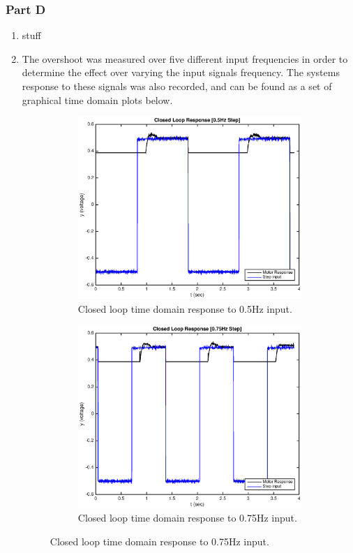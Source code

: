 \documentclass[11pt,a4paper]{article}
\begin{document}
\subsubsection{Part D}
\label{sec:d}
\begin{enumerate}
	\item stuff
	
	
	
	
	
	\item The overshoot was measured over five different input frequencies in order to determine the effect over varying the input signals frequency. The systems response to these signals was also recorded, and can be found as a set of graphical time domain plots below.
	\begin{figure}[H]
	  \begin{subfigure}{0.5\textwidth}
	  \includegraphics[width=0.9\linewidth]{Matlab_Code/Figures/D2_0_5Hz.eps} 
	  \caption{Closed loop time domain response to 0.5Hz input.}
	  \label{fig:subim1}
	  \end{subfigure}
	  \begin{subfigure}{0.5\textwidth}
	  \includegraphics[width=0.9\linewidth]{Matlab_Code/Figures/D2_0_75Hz.eps}
	  \caption{Closed loop time domain response to 0.75Hz input.}
	  \label{fig:subim2}
	  \end{subfigure}
	  

\end{figure}
\end{enumerate}
\end{document}
